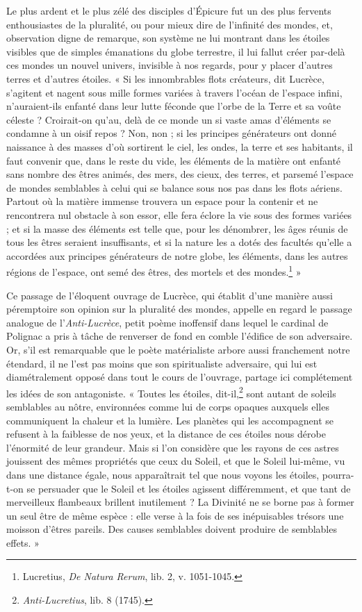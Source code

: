 \documentclass[a4paper, 11pt, oneside, landscape]{article}
\begin{document}
Le plus ardent et le plus zélé des disciples d'Épicure fut un des plus fervents enthousiastes de la pluralité, ou pour mieux dire de l'infinité des mondes, et, observation digne de remarque, son système ne lui montrant dans les étoiles visibles que de simples émanations du globe terrestre, il lui fallut créer par-delà ces mondes un nouvel univers, invisible à nos regards, pour y placer d'autres terres et d'autres étoiles. « Si les innombrables flots créateurs, dit Lucrèce, s'agitent et nagent sous mille formes variées à travers l'océan de l'espace infini, n'auraient-ils enfanté dans leur lutte féconde que l'orbe de la Terre et sa voûte céleste ? Croirait-on qu'au, delà de ce monde un si vaste amas d'éléments se condamne à un oisif repos ? Non, non ; si les principes générateurs ont donné naissance à des masses d'où sortirent le ciel, les ondes, la terre et ses habitants, il faut convenir que, dans le reste du vide, les éléments de la matière ont enfanté sans nombre des êtres animés, des mers, des cieux, des terres, et parsemé l'espace de mondes semblables à celui qui se balance sous nos pas dans les flots aériens. Partout où la matière immense trouvera un espace pour la contenir et ne rencontrera nul obstacle à son essor, elle fera éclore la vie sous des formes variées ; et si la masse des éléments est telle que, pour les dénombrer, les âges réunis de tous les êtres seraient insuffisants, et si la nature les a dotés des facultés qu'elle a accordées aux principes générateurs de notre globe, les éléments, dans les autres régions de l'espace, ont semé des êtres, des mortels et des mondes.\footnote{Lucretius, \emph{De Natura Rerum}, lib. 2, v. 1051-1045.} »

Ce passage de l'éloquent ouvrage de Lucrèce, qui établit d'une manière aussi péremptoire son opinion sur la pluralité des mondes, appelle en regard le passage analogue de l'\emph{Anti-Lucrèce}, petit poème inoffensif dans lequel le cardinal de Polignac a pris à tâche de renverser de fond en comble l'édifice de son adversaire. Or, s'il est remarquable que le poète matérialiste arbore aussi franchement notre étendard, il ne l'est pas moins que son spiritualiste adversaire, qui lui est diamétralement opposé dans tout le cours de l'ouvrage, partage ici complétement les idées de son antagoniste. « Toutes les étoiles, dit-il,\footnote{\emph{Anti-Lucretius}, lib. 8 (1745).} sont autant de soleils semblables au nôtre, environnées comme lui de corps opaques auxquels elles communiquent la chaleur et la lumière. Les planètes qui les accompagnent se refusent à la faiblesse de nos yeux, et la distance de ces étoiles nous dérobe l'énormité de leur grandeur. Mais si l'on considère que les rayons de ces astres jouissent des mêmes propriétés que ceux du Soleil, et que le Soleil lui-même, vu dans une distance égale, nous apparaîtrait tel que nous voyons les étoiles, pourra-t-on se persuader que le Soleil et les étoiles agissent différemment, et que tant de merveilleux flambeaux brillent inutilement ? La Divinité ne se borne pas à former un seul être de même espèce : elle verse à la fois de ses inépuisables trésors une moisson d'êtres pareils. Des causes semblables doivent produire de semblables effets. »
\end{document}
